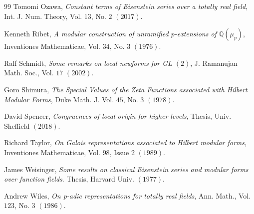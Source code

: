 \documentclass[a4paper,oneside]{amsart}
\theoremstyle{plain}
\theoremstyle{definition}
\begin{document}
\begin{thebibliography}{99}
Tomomi Ozawa, \emph{Constant terms of Eisenstein series over a totally real field}, Int. J. Num. Theory, Vol. $13$, No. $2$ $(2017)$.

Kenneth Ribet, \emph{A modular construction of unramified $p$-extensions of $\mathbb{Q}(\mu_p)$}, Inventiones Mathematicae, Vol. $34$, No. $3$ $(1976)$. 

Ralf Schmidt, \emph{Some remarks on local newforms for GL $(2)$}, J. Ramanujan Math. Soc., Vol. $17$ $(2002)$.

Goro Shimura, \emph{The Special Values of the Zeta Functions associated with Hilbert Modular Forms}, Duke Math. J.
Vol. $45$, No. $3$ $(1978)$.

David Spencer, \emph{Congruences of local origin for higher levels}, Thesis, Univ. Sheffield $(2018)$.

Richard Taylor, \emph{On Galois representations associated to Hilbert modular forms}, Inventiones Mathematicae, Vol. $98$, Issue $2$ $(1989)$.

James Weisinger, \emph{Some results on classical Eisenstein series and modular forms over function fields}.
Thesis, Harvard Univ. $(1977)$.

Andrew Wiles, \emph{On p-adic representations for totally real fields}, Ann. Math., Vol. $123$, No. $3$ $(1986)$.

\end{thebibliography}
\end{document}
